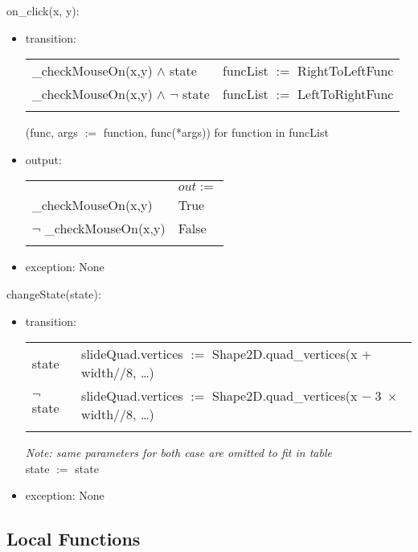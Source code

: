\documentclass{article}
\begin{document}
\noindent on\_click(x, y):
\begin{itemize}
\item transition: 

\begin{tabular}{|l|l|}
\hhline{|-|-|}
\_checkMouseOn(x,y) $\land$ state & funcList $:=$ RightToLeftFunc \\
\hhline{|-|-|}
\_checkMouseOn(x,y) $\land$ $\neg$ state & funcList $:=$ LeftToRightFunc \\
\hhline{|-|-|}
\end{tabular}

(func, args $:=$ function, func(*args)) for function in funcList
\item output: 

\begin{tabular}{|l|l|}
\hhline{~|-|}
\multicolumn{1}{r|}{} & \multicolumn{1}{l|}{$out :=$}\\
\hhline{|-|-|}
\_checkMouseOn(x,y) & True \\
\hhline{|-|-|}
$\neg$ \_checkMouseOn(x,y) & False \\
\hhline{|-|-|}
\end{tabular}

\item exception: None
\end{itemize}\vspace{6mm}

\noindent changeState(state):
\begin{itemize}
\item transition: 

\begin{tabular}{|l|l|}
\hhline{|-|-|}
state & slideQuad.vertices $:=$ Shape2D.quad\_vertices(x + width//8, \dots) \\
\hhline{|-|-|}
$\neg$ state & slideQuad.vertices $:=$ Shape2D.quad\_vertices(x $- \; 3 \;\times$ width//8, \dots) \\
\hhline{|-|-|}
\end{tabular}

\textit{Note: same parameters for both case are omitted to fit in table}\\
state $:=$ state
\item exception: None
\end{itemize}\vspace{6mm}

\subsection{Local Functions}
\end{document}
